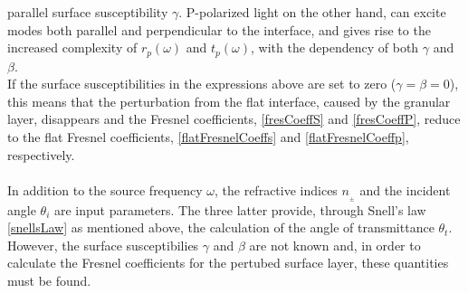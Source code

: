 parallel surface susceptibility $\gamma$.
P-polarized light on the other hand, can excite modes both parallel and perpendicular to the 
interface, and gives rise to the increased complexity of $r_p(\omega)$ and $t_p(\omega)$, with the
dependency of both $\gamma$ and $\beta$. \\
If the surface susceptibilities in the expressions above are set to zero ($\gamma = \beta = 0$),
this means that the perturbation from the flat interface, caused by the granular layer, 
disappears and
the Fresnel coefficients, \eqref{fresCoeffS} and \eqref{fresCoeffP}, reduce to the flat Fresnel 
coefficients, \eqref{flatFresnelCoeffs} and \eqref{flatFresnelCoeffp}, respectively.
\\
\\
In addition to the source frequency $\omega$, the refractive indices $n_{_{\pm}}$ and the incident
angle $\theta_i$ are input parameters. The three latter provide, through Snell's law \eqref{snellsLaw} 
as mentioned above, the calculation of the angle of transmittance $\theta_t$.
However, the surface susceptibilies $\gamma$ and $\beta$ are not known and, 
in order to calculate the Fresnel coefficients for the pertubed surface layer, 
these quantities must be found.

